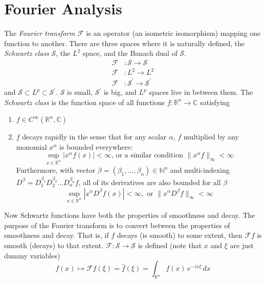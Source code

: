 \section{Fourier Analysis}

	The \textit{Fourier transform} $\mathcal{F}$ is an operator (an isometric isomorphism) mapping one function to another. There are three spaces where it is naturally defined, the \textit{Schwartz class} $\mathcal{S}$, the $L^2$ space, and the Banach dual of $\mathcal{S}$. 
	\begin{align*}
			\mathcal{F} &: \mathcal{S} \to \mathcal{S} \\
			\mathcal{F} &: L^2 \to L^2 \\
			\mathcal{F} &: \mathcal{S}^\prime \to \mathcal{S}^\prime 
	\end{align*}
	and $\mathcal{S} \subset L^p \subset \mathcal{S}^\prime$. $\mathcal{S}$ is small, $\mathcal{S}^\prime$ is big, and $L^p$ spaces live in between them. The \textit{Schwartz class} is the function space of all functions $f: \mathbb{R}^n \to \mathbb{C}$ satisfying 
	\begin{enumerate}
			\item $f \in C^\infty (\mathbb{R}^n, \mathbb{C})$ 
			\item $f$ decays rapidly in the sense that for any scalar $\alpha$, $f$ multiplied by any monomial $x^\alpha$ is bounded everywhere: 
			\begin{equation}
			  \sup_{x \in \mathbb{R}^n} | x^\alpha f (x)| < \infty \text{, or a similar condition } \|x^\alpha f \|_\infty < \infty
			\end{equation}
			Furthermore, with vector $\beta = (\beta_1, \ldots, \beta_n) \in \mathbb{N}^n$ and multi-indexing $D^\beta = D_1^{\beta_1} D_2^{\beta_2} \ldots D_n^{\beta_n} f$, all of its derivatives are also bounded for all $\beta$
			\begin{equation}
			  \sup_{x \in \mathbb{R}^n} |x^\alpha D^\beta f(x)| < \infty, \text{ or } \|x^\alpha D^\beta f\|_\infty < \infty
			\end{equation}
	\end{enumerate}
	Now Schwartz functions have both the properties of smoothness and decay. The purpose of the Fourier transform is to convert between the properties of smoothness and decay. That is, if $f$ decays (is smooth) to some extent, then $\mathcal{F}f$ is smooth (decays) to that extent. $\mathcal{F}: \mathcal{S} \to \mathcal{S}$ is defined (note that $x$ and $\xi$ are just dummy variables)
	\begin{equation}
	  f(x) \mapsto \mathcal{F} f (\xi) = \hat{f} (\xi) = \int_{\mathbb{R}^n} f(x) \, e^{-i x \xi} \, dx
	\end{equation}
